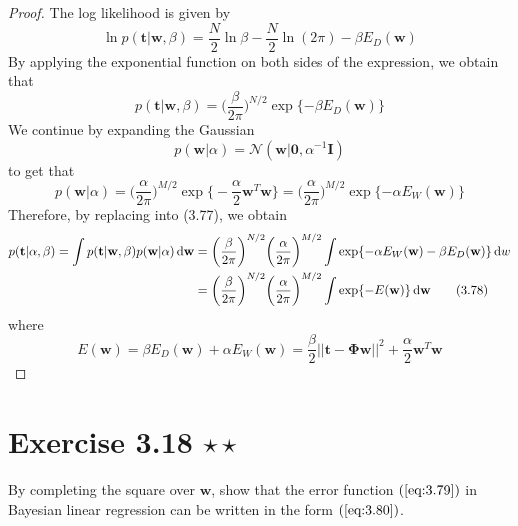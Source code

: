 \begin{proof}
    The log likelihood is given by
    \begin{equation}\label{eq:3.11}\tag{3.11}
        \ln p(\mathbf{t} | \mathbf{w}, \beta) 
        = \frac{N}{2} \ln \beta - \frac{N}{2} \ln(2\pi) - \beta E_D(\mathbf{w})
    \end{equation}
    By applying the exponential function on both sides of the expression, we obtain that
    \[
        p(\mathbf{t} | \mathbf{w}, \beta) 
        = \bigg(\frac{\beta}{2\pi}\bigg)^{N/2} \exp \{-\beta E_D(\mathbf{w})\}
    \] 
    We continue by expanding the Gaussian
    \begin{equation}\label{eq:3.52}\tag{3.52}
        p(\mathbf{w} | \alpha) = \mathcal{N}(\mathbf{w} | \mathbf{0}, \alpha^{-1} \mathbf{I})
    \end{equation}
    to get that
    \[
        p(\mathbf{w} | \alpha) 
        = \bigg(\frac{\alpha}{2\pi}\bigg)^{M / 2} 
            \exp\bigg\{-\frac{\alpha}{2} \mathbf{w}^T\mathbf{w}\bigg\}
        = \bigg(\frac{\alpha}{2\pi}\bigg)^{M / 2}  \exp\{-\alpha E_W(\mathbf{w})\}
    \] 
    Therefore, by replacing into (3.77), we obtain
    \begin{align*}
        p(\mathbf{t} | \alpha, \beta)
        = \int p(\mathbf{t} | \mathbf{w}, \beta) p(\mathbf{w} | \alpha) \mathop{}\!\mathrm{d} \mathbf{w}
        &= \bigg(\frac{\beta}{2\pi}\bigg)^{N/2} \bigg(\frac{\alpha}{2\pi}\bigg)^{M/2}
        \int \exp\{-\alpha E_W(\mathbf{w}) - \beta E_D(\mathbf{w})\} \mathop{}\!\mathrm{d} w \\
        &= \bigg(\frac{\beta}{2\pi}\bigg)^{N/2} \bigg(\frac{\alpha}{2\pi}\bigg)^{M/2}
        \int \exp\{-E(\mathbf{w})\} \mathop{}\!\mathrm{d} \mathbf{w} \label{eq:3.78} \tag{3.78}
    \end{align*}
    where
    \begin{equation}\label{eq:3.79}\tag{3.79}
        E(\mathbf{w}) 
        = \beta E_D(\mathbf{w}) + \alpha E_W(\mathbf{w})
        = \frac{\beta}{2} ||\mathbf{t} - \mathbf{\Phi}\mathbf{w}||^2 
        + \frac{\alpha}{2} \mathbf{w}^T\mathbf{w}
    \end{equation}
\end{proof}

\section*{Exercise 3.18 $\star \star$}
By completing the square over $\mathbf{w}$, show that the error function
$(\ref{eq:3.79})$ in Bayesian linear regression can be written in the form
$(\ref{eq:3.80})$.

